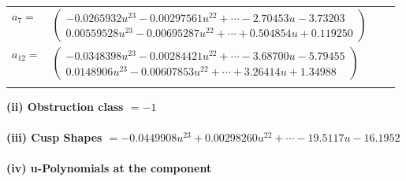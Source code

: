 \documentclass[1p]{elsarticle_modified}
\theoremstyle{definition}
\begin{document}
\begin{tabular}{m{7pt} m{180pt} m{7pt} m{180pt} }
\flushright $a_{7}=$&$\begin{pmatrix}-0.0265932 u^{23}-0.00297561 u^{22}+\cdots-2.70453 u-3.73203\\0.00559528 u^{23}-0.00695287 u^{22}+\cdots+0.504854 u+0.119250\end{pmatrix}$ \\
\flushright $a_{12}=$&$\begin{pmatrix}-0.0348398 u^{23}-0.00284421 u^{22}+\cdots-3.68700 u-5.79455\\0.0148906 u^{23}-0.00607853 u^{22}+\cdots+3.26414 u+1.34988\end{pmatrix}$\\&\end{tabular}
\flushleft \textbf{(ii) Obstruction class $= -1$}\\~\\
\flushleft \textbf{(iii) Cusp Shapes $= -0.0449908 u^{23}+0.00298260 u^{22}+\cdots-19.5117 u-16.1952$}\\~\\
\newpage\renewcommand{\arraystretch}{1}
\flushleft \textbf{(iv) u-Polynomials at the component}\newline \\
\end{document}
